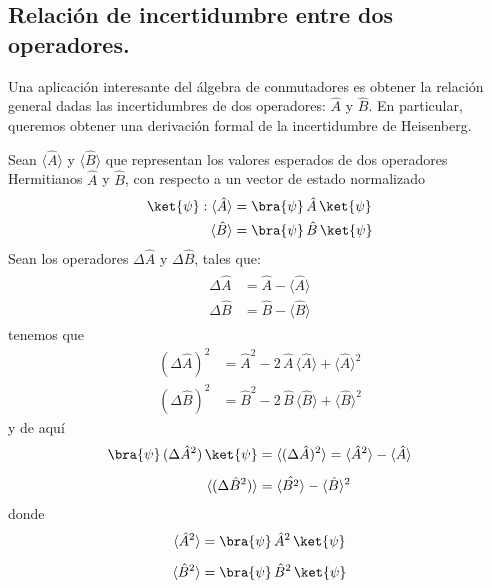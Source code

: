 \subsection{Relación de incertidumbre entre dos operadores.}

Una aplicación interesante del álgebra de conmutadores es obtener la relación general dadas las incertidumbres de dos operadores: $\hat{A}$ y $\hat{B}$. En particular, queremos obtener una derivación formal de la incertidumbre de Heisenberg.
\par
Sean $\langle \hat{A} \rangle$ y $ \langle \hat{B} \rangle$ que representan los valores esperados de dos operadores Hermitianos $\hat{A}$ y $\hat{B}$, con respecto a un vector de estado normalizado 
\begin{align*}
\ket{\psi}: \langle \hat{A} \rangle &= \bra{\psi} \, \hat{A} \, \ket{\psi} \\
\langle \hat{B} \rangle &= \bra{\psi} \, \hat{B} \, \ket{\psi}
\end{align*}
Sean los operadores $\Delta \hat{A}$ y $\Delta \hat{B}$, tales que:
\begin{align}
\begin{aligned}
\Delta \hat{A} &= \hat{A} - \langle \hat{A} \rangle \\
\Delta \hat{B} &= \hat{B} - \langle \hat{B} \rangle
\end{aligned}
\label{eq:ecuacion_02_95}
\end{align}
tenemos que
\begin{align*}
(\Delta \hat{A})^{2} &= \hat{A}^{2} - 2 \, \hat{A} \, \langle \hat{A} \rangle + \langle \hat{A} \rangle^{2} \\
(\Delta \hat{B})^{2} &= \hat{B}^{2} - 2 \, \hat{B} \, \langle \hat{B} \rangle + \langle \hat{B} \rangle^{2}
\end{align*}
y de aquí
\begin{align}
\begin{aligned}
\bra{\psi} \, (\Delta \hat{A}^{2}) \, \ket{\psi} &= \langle (\Delta \hat{A})^{2} \rangle = \langle \hat{A}^{2} \rangle - \langle \hat{A} \rangle \\[0.5em]
\langle (\Delta \hat{B}^{2}) \rangle &= \langle \hat{B^{2}} \rangle - \langle \hat{B} \rangle^{2}
\end{aligned}
\label{eq:ecuacion_02_96}
\end{align}
donde
\begin{align*}
\langle \hat{A}^{2} \rangle &= \bra{\psi} \, \hat{A}^{2} \, \ket{\psi} \\[0.5em]
\langle \hat{B}^{2} \rangle &= \bra{\psi} \, \hat{B}^{2} \, \ket{\psi}
\end{align*}
